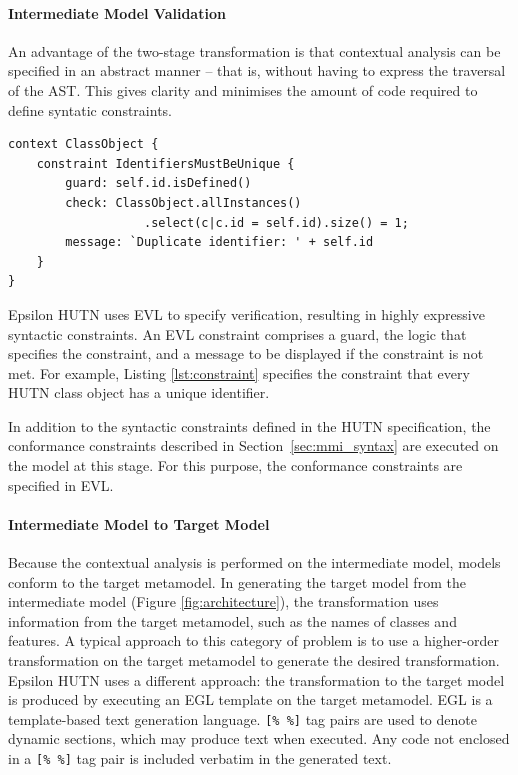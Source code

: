 \paragraph{Intermediate Model Validation}
An advantage of the two-stage transformation is that contextual analysis can be specified in an abstract manner -- that is, without having to express the traversal of the AST. This gives clarity and minimises the amount of code required to define syntatic constraints.

\begin{lstlisting}[caption=A constraint (in EVL) to check that all identifiers are unique., label=lst:constraint, language=EVL]
context ClassObject {
    constraint IdentifiersMustBeUnique {
        guard: self.id.isDefined()
        check: ClassObject.allInstances()
                   .select(c|c.id = self.id).size() = 1;
        message: `Duplicate identifier: ' + self.id
    }
}
\end{lstlisting}

Epsilon HUTN uses EVL \cite{kolovos08evl} to specify verification, resulting in highly expressive syntactic constraints. An EVL constraint comprises a guard, the logic that specifies the constraint, and a message to be displayed if the constraint is not met. For example, Listing \ref{lst:constraint} specifies the constraint that every HUTN class object has a unique identifier.

In addition to the syntactic constraints defined in the HUTN specification, the conformance constraints described in Section~\ref{sec:mmi_syntax} are executed on the model at this stage. For this purpose, the conformance constraints are specified in EVL.

\paragraph{Intermediate Model to Target Model}
Because the contextual analysis is performed on the intermediate model, models conform to the target metamodel. In generating the target model from the intermediate model (Figure \ref{fig:architecture}), the transformation uses information from the target metamodel, such as the names of classes and features. A typical approach to this category of problem is to use a higher-order transformation on the target metamodel to generate the desired transformation. Epsilon HUTN uses a different approach: the transformation to the target model is produced by executing an EGL template on the target metamodel. EGL is a template-based text generation language. \verb|[% %]| tag pairs are used to denote dynamic sections, which may produce text when executed. Any code not enclosed in a \verb|[% %]| tag pair is included verbatim in the generated text.

